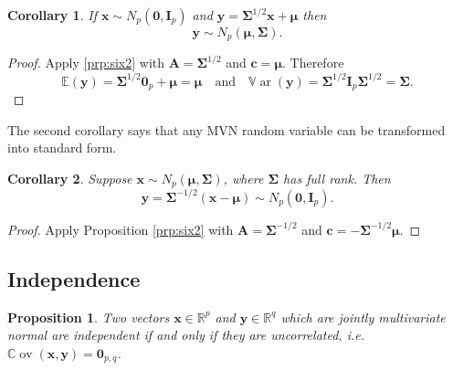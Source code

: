 \documentclass[
]{book}
\newtheorem{corollary}{Corollary}[chapter]
\newtheorem{proposition}{Proposition}[chapter]
\theoremstyle{definition}
\theoremstyle{definition}
\theoremstyle{definition}
\theoremstyle{definition}
\theoremstyle{remark}
\begin{document}
\begin{corollary}
\protect\hypertarget{cor:csix2}{}{\label{cor:csix2} } If \(\mathbf x\sim N_p(\boldsymbol 0,\mathbf I_p)\) and \(\mathbf y= \boldsymbol{\Sigma}^{1/2} \mathbf x+ {\boldsymbol{\mu}}\) then \[\mathbf y\sim N_p({\boldsymbol{\mu}},\boldsymbol{\Sigma}).\]
\end{corollary}

\begin{proof}
Apply \ref{prp:six2} with \(\mathbf A= \boldsymbol{\Sigma}^{1/2}\) and \(\mathbf c= {\boldsymbol{\mu}}\). Therefore
\[{\mathbb{E}}(\mathbf y) = \boldsymbol{\Sigma}^{1/2} \boldsymbol 0_p + {\boldsymbol{\mu}}= {\boldsymbol{\mu}}\quad \mbox{and}\quad {\mathbb{V}\operatorname{ar}}(\mathbf y) = \boldsymbol{\Sigma}^{1/2} \mathbf I_p \boldsymbol{\Sigma}^{1/2} = \boldsymbol{\Sigma}.\]
\end{proof}

The second corollary says that any MVN random variable can be transformed into standard form.

\begin{corollary}
\protect\hypertarget{cor:csix3}{}{\label{cor:csix3} }Suppose \(\mathbf x\sim N_p({\boldsymbol{\mu}},\boldsymbol{\Sigma})\), where \(\boldsymbol{\Sigma}\) has full rank. Then\\
\[\mathbf y= \boldsymbol{\Sigma}^{-1/2}(\mathbf x- {\boldsymbol{\mu}}) \sim N_p(\boldsymbol 0,\mathbf I_p).\]
\end{corollary}

\begin{proof}
Apply Proposition \ref{prp:six2} with \(\mathbf A= \boldsymbol{\Sigma}^{-1/2}\) and \(\mathbf c= - \boldsymbol{\Sigma}^{-1/2} {\boldsymbol{\mu}}\).
\end{proof}

\hypertarget{independence}{%
\subsection{Independence}\label{independence}}

\begin{proposition}
\protect\hypertarget{prp:six4}{}{\label{prp:six4} }Two vectors \(\mathbf x\in\mathbb{R}^p\) and \(\mathbf y\in\mathbb{R}^q\) which are jointly multivariate normal are independent if and only if they are uncorrelated, i.e.~\({\mathbb{C}\operatorname{ov}}(\mathbf x,\mathbf y) = \boldsymbol 0_{p,q}\).
\end{proposition}
\end{document}
